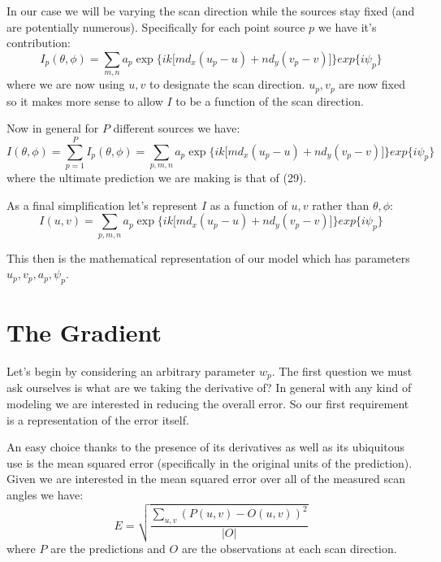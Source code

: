 \documentclass[12pt,a6paper]{book}
\begin{document}
In our case we will be varying the scan direction while the sources stay fixed (and are potentially numerous). Specifically for each point source $p$ we have it's contribution:
\begin{equation}
I_p(\theta, \phi) = \sum_{m,n}a_p\exp\lbrace ik \lbrack md_x(u_p-u)+nd_y(v_p-v)\rbrack\rbrace exp\lbrace i\psi_p \rbrace
\end{equation}
where we are now using $u,v$ to designate the scan direction. $u_p, v_p$ are now fixed so it makes more sense to allow $I$ to be a function of the scan direction. 

Now in general for $P$ different sources we have:
\begin{equation}
I(\theta, \phi) = \sum_{p=1}^{P} I_p(\theta, \phi)= \sum_{p,m,n}a_p\exp\lbrace ik \lbrack md_x(u_p-u)+nd_y(v_p-v)\rbrack\rbrace exp\lbrace i\psi_p \rbrace
\end{equation}
where the ultimate prediction we are making is that of (29).

As a final simplification let's represent $I$ as a function of $u,v$ rather than $\theta, \phi$:
\begin{equation}
I(u, v) = \sum_{p,m,n}a_p\exp\lbrace ik \lbrack md_x(u_p-u)+nd_y(v_p-v)\rbrack\rbrace exp\lbrace i\psi_p \rbrace
\end{equation}

This then is the mathematical representation of our model which has parameters $u_p,v_p,a_p,\psi_p$.

\section{The Gradient}
Let's begin by considering an arbitrary parameter $w_p$. The first question we must ask ourselves is what are we taking the derivative of? In general with any kind of modeling we are interested in reducing the overall error. So our first requirement is a representation of the error itself.

An easy choice thanks to the presence of its derivatives as well as its ubiquitous use is the mean squared error (specifically in the original units of the prediction). Given we are interested in the mean squared error over all of the measured scan angles we have:
\begin{equation}
E = \sqrt{\frac{\sum_{u,v}(P(u,v) - O(u,v))^2}{|O|}} 
\end{equation}
where $P$ are the predictions and $O$ are the observations at each scan direction.
\end{document}
